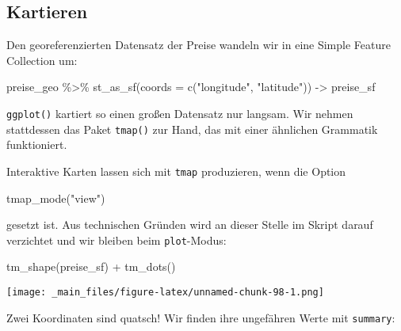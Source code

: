 \documentclass[11pt,german,a4paper]{article}
\newenvironment{Shaded}{\begin{snugshade}}{\end{snugshade}}
\newcommand{\AttributeTok}[1]{\textcolor[rgb]{0.77,0.63,0.00}{#1}}
\newcommand{\DocumentationTok}[1]{\textcolor[rgb]{0.56,0.35,0.01}{\textbf{\textit{#1}}}}
\newcommand{\FunctionTok}[1]{\textcolor[rgb]{0.00,0.00,0.00}{#1}}
\newcommand{\NormalTok}[1]{#1}
\newcommand{\OtherTok}[1]{\textcolor[rgb]{0.56,0.35,0.01}{#1}}
\newcommand{\SpecialCharTok}[1]{\textcolor[rgb]{0.00,0.00,0.00}{#1}}
\newcommand{\StringTok}[1]{\textcolor[rgb]{0.31,0.60,0.02}{#1}}
\begin{document}
\hypertarget{kartieren}{%
\subsection{Kartieren}\label{kartieren}}

Den georeferenzierten Datensatz der Preise wandeln wir in eine Simple Feature Collection um:

\begin{Shaded}
\begin{Highlighting}[]
\NormalTok{preise\_geo }\SpecialCharTok{\%\textgreater{}\%}
  \FunctionTok{st\_as\_sf}\NormalTok{(}\AttributeTok{coords =} \FunctionTok{c}\NormalTok{(}\StringTok{"longitude"}\NormalTok{, }\StringTok{"latitude"}\NormalTok{)) }\OtherTok{{-}\textgreater{}}\NormalTok{ preise\_sf}
\end{Highlighting}
\end{Shaded}

\texttt{ggplot()} kartiert so einen großen Datensatz nur langsam. Wir nehmen stattdessen das Paket \texttt{tmap()} zur Hand, das mit einer ähnlichen Grammatik funktioniert.

Interaktive Karten lassen sich mit \texttt{tmap} produzieren, wenn die Option

\begin{Shaded}
\begin{Highlighting}[]
\FunctionTok{tmap\_mode}\NormalTok{(}\StringTok{"view"}\NormalTok{)}
\end{Highlighting}
\end{Shaded}

gesetzt ist. Aus technischen Gründen wird an dieser Stelle im Skript darauf verzichtet und wir bleiben beim \texttt{plot}-Modus:

\begin{Shaded}
\begin{Highlighting}[]
\FunctionTok{tm\_shape}\NormalTok{(preise\_sf) }\SpecialCharTok{+}
  \FunctionTok{tm\_dots}\NormalTok{()}
\end{Highlighting}
\end{Shaded}

\texttt{[image: \_main\_files/figure-latex/unnamed-chunk-98-1.png]}

Zwei Koordinaten sind quatsch! Wir finden ihre ungefähren Werte mit \texttt{summary}:

\begin{Shaded}
\end{Shaded}
\end{document}
